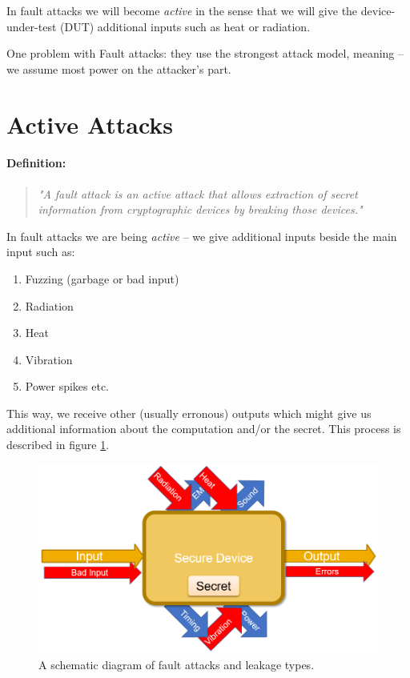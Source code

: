 In fault attacks we will become \emph{active} in the sense that we will give the device-under-test (DUT) additional inputs such as heat or radiation.

One problem with Fault attacks: they use the strongest attack model, meaning -- we assume most power on the attacker's part.

\section{Active Attacks}
\paragraph{Definition:} 
\begin{quote}
    \textit{"A fault attack is an active attack that allows extraction of secret information from cryptographic devices by breaking those devices."}
\end{quote}

In fault attacks we are being \emph{active} -- we give additional inputs beside the main input such as:
\begin{enumerate}
	\item Fuzzing (garbage or bad input)
	\item Radiation
	\item Heat
	\item Vibration
	\item Power spikes etc.
\end{enumerate}

This way, we receive other (usually erronous) outputs which might give us additional information about the computation and/or the secret. This process is described in figure \ref{fig:fault_attacks_schematic}.

\begin{figure}[!ht]
    \centering
	\includegraphics[width=0.7\linewidth]{images/ch9/fault_attacks_schematic.png}
	\caption{A schematic diagram of fault attacks and leakage types.}
	\label{fig:fault_attacks_schematic}
\end{figure}

